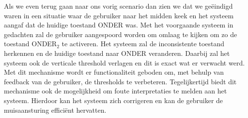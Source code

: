 \documentclass{article}
\begin{document}
Als we even terug gaan naar ons vorig scenario dan zien we dat we geëindigd waren in een situatie waar de gebruiker naar het midden keek en het systeem aangaf dat de huidige toestand ONDER was. Met het voorgaande systeem in gedachten zal de gebruiker aangespoord worden om omlaag te kijken om zo de toestand ONDER$_2$ te activeren. Het systeem zal de inconsistente toestand herkennen en de huidige toestand naar ONDER veranderen. Daarbij zal het systeem ook de verticale threshold verlagen en dit is exact wat er verwacht werd.\\

Met dit mechanisme wordt er functionaliteit geboden om, met behulp van feedback van de gebruiker, de thresholds te verbeteren. Tegelijkertijd biedt dit mechanisme ook de mogelijkheid om foute interpretaties te melden aan het systeem. Hierdoor kan het systeem zich corrigeren en kan de gebruiker de muisaansturing effici\"ent hervatten.
\end{document}
